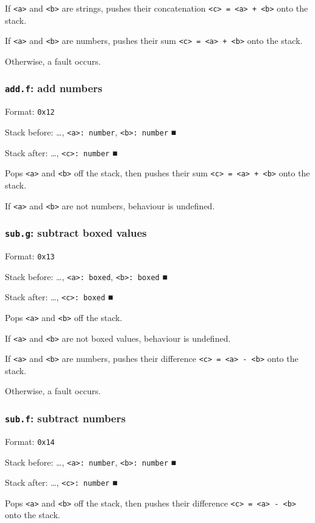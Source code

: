 If \texttt{<a>} and \texttt{<b>} are strings, pushes their concatenation
\texttt{<c> = <a> + <b>} onto the stack.

If \texttt{<a>} and \texttt{<b>} are numbers, pushes their sum \texttt{<c> = <a> + <b>} onto
the stack.

Otherwise, a fault occurs.

\subsubsection{\texttt{add.f}: add numbers}
\label{sec:org117c408}
Format: \texttt{0x12}

Stack before: \ldots{}​, \texttt{<a>: number}, \texttt{<b>: number} ■

Stack after: \ldots{}​, \texttt{<c>: number} ■

Pops \texttt{<a>} and \texttt{<b>} off the stack, then pushes their sum
\texttt{<c> = <a> + <b>} onto the stack.

If \texttt{<a>} and \texttt{<b>} are not numbers, behaviour is undefined.

\subsubsection{\texttt{sub.g}: subtract boxed values}
\label{sec:org379b868}
Format: \texttt{0x13}

Stack before: \ldots{}​, \texttt{<a>: boxed}, \texttt{<b>: boxed} ■

Stack after: \ldots{}​, \texttt{<c>: boxed} ■

Pops \texttt{<a>} and \texttt{<b>} off the stack.

If \texttt{<a>} and \texttt{<b>} are not boxed values, behaviour is undefined.

If \texttt{<a>} and \texttt{<b>} are numbers, pushes their difference
\texttt{<c> = <a> - <b>} onto the stack.

Otherwise, a fault occurs.

\subsubsection{\texttt{sub.f}: subtract numbers}
\label{sec:org371fd15}
Format: \texttt{0x14}

Stack before: \ldots{}​, \texttt{<a>: number}, \texttt{<b>: number} ■

Stack after: \ldots{}​, \texttt{<c>: number} ■

Pops \texttt{<a>} and \texttt{<b>} off the stack, then pushes their difference
\texttt{<c> = <a> - <b>} onto the stack.

